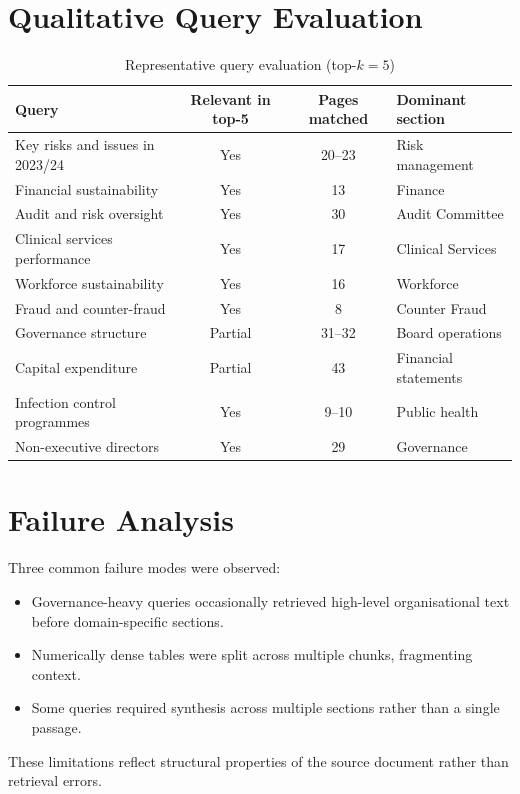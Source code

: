 \documentclass[12pt,a4paper]{report}
\begin{document}
\section{Qualitative Query Evaluation}
\begin{table}[H]
\centering
\caption{Representative query evaluation (top-$k = 5$)}
\begin{tabular}{p{5cm}ccp{3cm}}
\toprule
Query & Relevant in top-5 & Pages matched & Dominant section \\
\midrule
Key risks and issues in 2023/24 & Yes & 20--23 & Risk management \\
Financial sustainability & Yes & 13 & Finance \\
Audit and risk oversight & Yes & 30 & Audit Committee \\
Clinical services performance & Yes & 17 & Clinical Services \\
Workforce sustainability & Yes & 16 & Workforce \\
Fraud and counter-fraud & Yes & 8 & Counter Fraud \\
Governance structure & Partial & 31--32 & Board operations \\
Capital expenditure & Partial & 43 & Financial statements \\
Infection control programmes & Yes & 9--10 & Public health \\
Non-executive directors & Yes & 29 & Governance \\
\bottomrule
\end{tabular}
\end{table}

\section{Failure Analysis}
Three common failure modes were observed:
\begin{itemize}
  \item Governance-heavy queries occasionally retrieved high-level organisational text before domain-specific sections.
  \item Numerically dense tables were split across multiple chunks, fragmenting context.
  \item Some queries required synthesis across multiple sections rather than a single passage.
\end{itemize}

These limitations reflect structural properties of the source document rather than retrieval errors.
\end{document}
